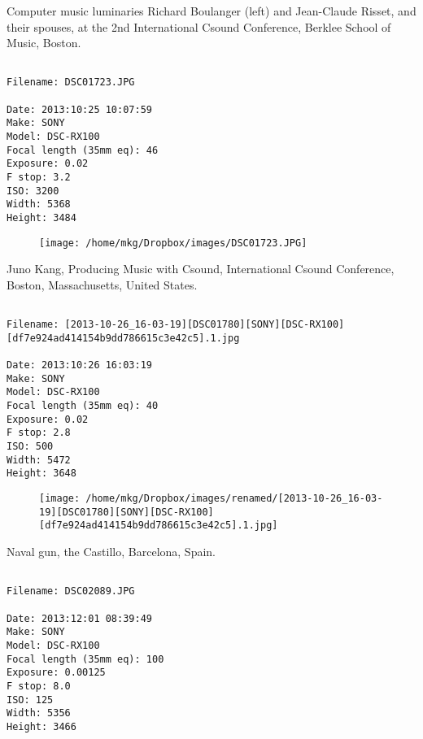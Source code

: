 \clearpage
\onecolumn
\noindent Computer music luminaries Richard Boulanger (left) and Jean-Claude Risset, and their spouses, at the 2nd International Csound Conference, Berklee School of Music, Boston.
\noindent
\begin{lstlisting}

Filename: DSC01723.JPG

Date: 2013:10:25 10:07:59
Make: SONY
Model: DSC-RX100
Focal length (35mm eq): 46
Exposure: 0.02
F stop: 3.2
ISO: 3200
Width: 5368
Height: 3484
\end{lstlisting}
\clearpage

\begin{figure}
\texttt{[image: /home/mkg/Dropbox/images/DSC01723.JPG]}
\end{figure}
    
\clearpage
\onecolumn
\noindent Juno Kang, Producing Music with Csound, International Csound Conference, Boston, Massachusetts, United States.
\noindent
\begin{lstlisting}

Filename: [2013-10-26_16-03-19][DSC01780][SONY][DSC-RX100][df7e924ad414154b9dd786615c3e42c5].1.jpg

Date: 2013:10:26 16:03:19
Make: SONY
Model: DSC-RX100
Focal length (35mm eq): 40
Exposure: 0.02
F stop: 2.8
ISO: 500
Width: 5472
Height: 3648
\end{lstlisting}
\clearpage

\begin{figure}
\texttt{[image: /home/mkg/Dropbox/images/renamed/[2013-10-26\_16-03-19][DSC01780][SONY][DSC-RX100][df7e924ad414154b9dd786615c3e42c5].1.jpg]}
\end{figure}
    
\clearpage
\onecolumn
\noindent Naval gun, the Castillo, Barcelona, Spain.
\noindent
\begin{lstlisting}

Filename: DSC02089.JPG

Date: 2013:12:01 08:39:49
Make: SONY
Model: DSC-RX100
Focal length (35mm eq): 100
Exposure: 0.00125
F stop: 8.0
ISO: 125
Width: 5356
Height: 3466
\end{lstlisting}
\clearpage

